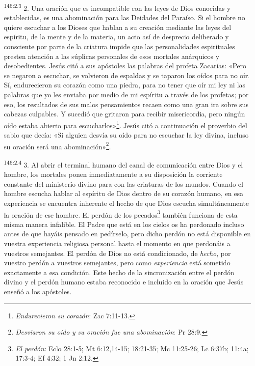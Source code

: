 \par
\textsuperscript{146:2.3} 2. Una oración que es incompatible con las leyes de Dios conocidas y establecidas, es una abominación para las Deidades del Paraíso. Si el hombre no quiere escuchar a los Dioses que hablan a su creación mediante las leyes del espíritu, de la mente y de la materia, un acto así de desprecio deliberado y consciente por parte de la criatura impide que las personalidades espirituales presten atención a las súplicas personales de esos mortales anárquicos y desobedientes. Jesús citó a sus apóstoles las palabras del profeta Zacarías: «Pero se negaron a escuchar, se volvieron de espaldas y se taparon los oídos para no oír. Sí, endurecieron su corazón como una piedra, para no tener que oír mi ley ni las palabras que yo les enviaba por medio de mi espíritu a través de los profetas; por eso, los resultados de sus malos pensamientos recaen como una gran ira sobre sus cabezas culpables. Y sucedió que gritaron para recibir misericordia, pero ningún oído estaba abierto para escucharlos»\footnote{\textit{Endurecieron su corazón}: Zac 7:11-13.}. Jesús citó a continuación el proverbio del sabio que decía: «Si alguien desvía su oído para no escuchar la ley divina, incluso su oración será una abominación»\footnote{\textit{Desviaron su oído y su oración fue una abominación}: Pr 28:9.}.

\par
\textsuperscript{146:2.4} 3. Al abrir el terminal humano del canal de comunicación entre Dios y el hombre, los mortales ponen inmediatamente a su disposición la corriente constante del ministerio divino para con las criaturas de los mundos. Cuando el hombre escucha hablar al espíritu de Dios dentro de su corazón humano, en esa experiencia se encuentra inherente el hecho de que Dios escucha simultáneamente la oración de ese hombre. El perdón de los pecados\footnote{\textit{El perdón}: Eclo 28:1-5; Mt 6:12,14-15; 18:21-35; Mc 11:25-26; Lc 6:37b; 11:4a; 17:3-4; Ef 4:32; 1 Jn 2:12.} también funciona de esta misma manera infalible. El Padre que está en los cielos os ha perdonado incluso antes de que hayáis pensado en pedírselo, pero dicho perdón no está disponible en vuestra experiencia religiosa personal hasta el momento en que perdonáis a vuestros semejantes. El perdón de Dios no está condicionado, de \textit{hecho}, por vuestro perdón a vuestros semejantes, pero como \textit{experiencia} está sometido exactamente a esa condición. Este hecho de la sincronización entre el perdón divino y el perdón humano estaba reconocido e incluido en la oración que Jesús enseñó a los apóstoles.

